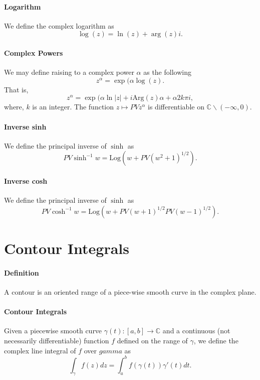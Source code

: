 \documentclass[12pt, letterpaper]{article}
\begin{document}
    \paragraph{Logarithm}
    We define the complex logarithm as 
    \[\log(z) = \ln(z) + \arg(z)i.\]
    
    \paragraph{Complex Powers}
    We may define raising to a complex power \(\alpha\) as the following
    \[ z^\alpha = \exp(\alpha \log (z).\]
    That is,
    \[z^\alpha = \exp(\alpha \ln|z| + i\mathrm{Arg}(z)\alpha + \alpha 2k\pi i,\]
    where, \(k\) is an integer.
    \newline \indent
    The function \(z\mapsto PVz^\alpha\) is differentiable on 
    \(\mathbb{C} \backslash (-\infty, 0).\)
    
    \paragraph{Inverse sinh}
    We define the principal inverse of \(\sinh\) as 
    \[PV \sinh^{-1} w = \mathrm{Log}(w + PV(w^2 + 1)^{1/2}).\]
    \paragraph{Inverse cosh}
    We define the principal inverse of \(\sinh\) as 
    \[PV \cosh^{-1} w = \mathrm{Log}(w + PV(w + 1)^{1/2} PV (w-1)^{1/2}).\]

    
    \section{Contour Integrals}
    \paragraph{Definition}  A contour is an oriented range of a piece-wise
    smooth curve in the complex plane.

    \paragraph{Contour Integrals} Given a piecewise smooth curve
    \(\gamma(t): [a, b] \to \mathbb{C}\) and a continuous (not necessarily differentiable)
    function \(f\) defined on the range of \(\gamma\), we define the complex
    line integral of \(f\) over \(gamma\) as
    \[\int_{\gamma} f(z) dz = \int_{a}^{b} f(\gamma(t)) \gamma '(t)dt. \]
\end{document}
